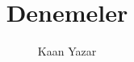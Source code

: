 \documentclass[english]{book}
\begin{document}
\title{Denemeler}
\author{Kaan Yazar}
\maketitle
%
\mainmatter
\tableofcontents
%
{



}
{

}
\end{document}
